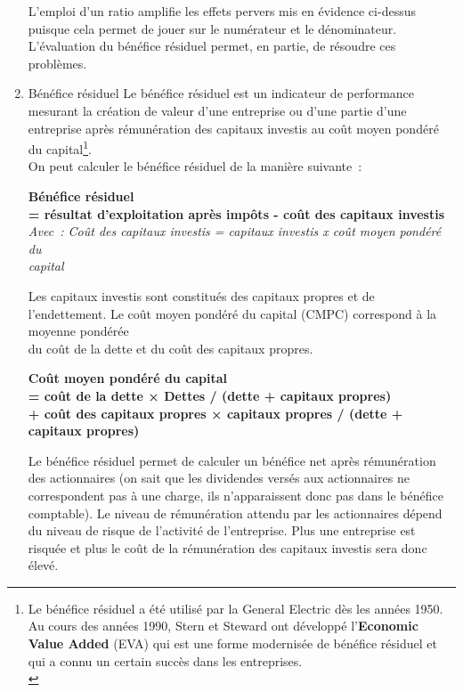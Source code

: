 \documentclass{tufte-handout}
\begin{document}
\begin{enumerate}
L'emploi d'un ratio amplifie les effets pervers mis en évidence ci-dessus puisque cela permet de jouer sur le numérateur et le dénominateur. L'évaluation du bénéfice résiduel permet, en partie, de résoudre ces problèmes.\\
\item Bénéfice résiduel
\label{sec:org11e31ae}
Le bénéfice résiduel est un indicateur de performance mesurant la création de valeur d'une entreprise ou d'une partie d'une entreprise après rémunération des capitaux investis au coût moyen pondéré du capital\footnote{Le bénéfice résiduel a été utilisé par la General Electric dès les années 1950. Au cours des années 1990, Stern et Steward ont développé l'\textbf{Economic Value Added} (EVA) qui est une forme modernisée de bénéfice résiduel et qui a connu un certain succès dans les entreprises.\\}.\\

On peut calculer le bénéfice résiduel de la manière suivante :\\
\begin{center}
\textbf{Bénéfice résiduel}\\
\textbf{= résultat d'exploitation après impôts - coût des capitaux investis}\\
\emph{Avec : Coût des capitaux investis = capitaux investis x coût moyen pondéré du\\
capital}\\
\end{center}
Les capitaux investis sont constitués des capitaux propres et de\\
l'endettement. Le coût moyen pondéré du capital (CMPC) correspond à la moyenne pondérée\\
du coût de la dette et du coût des capitaux propres.\\
\begin{center}
\textbf{Coût moyen pondéré du capital} \\
\textbf{=  coût de la dette × Dettes / (dette + capitaux propres)} \\
\textbf{+ coût des capitaux propres × capitaux propres / (dette + capitaux propres)}\\
\end{center}

Le bénéfice résiduel permet de calculer un bénéfice net après rémunération des actionnaires (on sait que les dividendes versés aux actionnaires ne correspondent pas à une charge, ils n'apparaissent donc pas dans le bénéfice comptable). Le niveau de rémunération attendu par les actionnaires dépend du niveau de risque de l'activité de l'entreprise. Plus une entreprise est risquée et plus le coût de la rémunération des capitaux investis sera donc élevé.\\


\end{enumerate}
\end{document}
